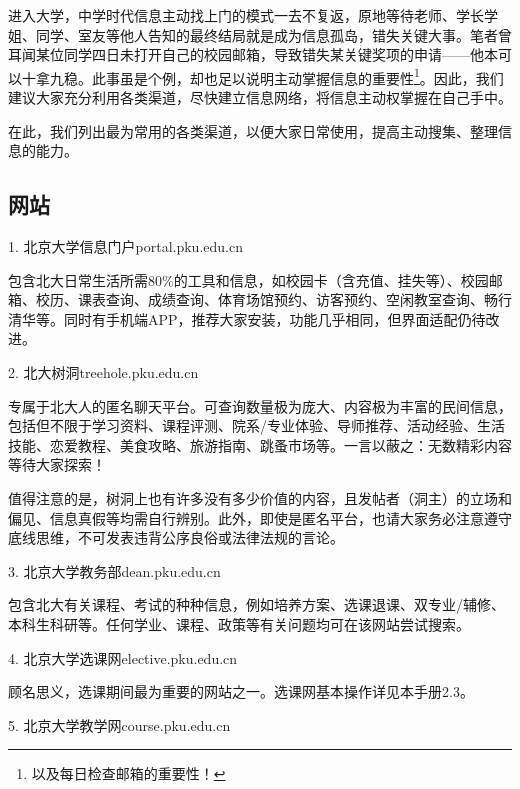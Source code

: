 \documentclass[11pt,oneside]{book}
\begin{document}
进入大学，中学时代信息主动找上门的模式一去不复返，原地等待老师、学长学姐、同学、室友等他人告知的最终结局就是成为信息孤岛，错失关键大事。笔者曾耳闻某位同学四日未打开自己的校园邮箱，导致错失某关键奖项的申请——他本可以十拿九稳。此事虽是个例，却也足以说明主动掌握信息的重要性\footnote{以及每日检查邮箱的重要性！}。因此，我们建议大家充分利用各类渠道，尽快建立信息网络，将信息主动权掌握在自己手中。

在此，我们列出最为常用的各类渠道，以便大家日常使用，提高主动搜集、整理信息的能力。

\subsection{网站}

1. 北京大学信息门户\quad portal.pku.edu.cn

包含北大日常生活所需80\%的工具和信息，如校园卡（含充值、挂失等）、校园邮箱、校历、课表查询、成绩查询、体育场馆预约、访客预约、空闲教室查询、畅行清华等。同时有手机端APP，推荐大家安装，功能几乎相同，但界面适配仍待改进。

\vspace{10pt}

2. 北大树洞\quad treehole.pku.edu.cn

专属于北大人的匿名聊天平台。可查询数量极为庞大、内容极为丰富的民间信息，包括但不限于学习资料、课程评测、院系/专业体验、导师推荐、活动经验、生活技能、恋爱教程、美食攻略、旅游指南、跳蚤市场等。一言以蔽之：无数精彩内容等待大家探索！

值得注意的是，树洞上也有许多没有多少价值的内容，且发帖者（洞主）的立场和偏见、信息真假等均需自行辨别。此外，即使是匿名平台，也请大家务必注意遵守底线思维，不可发表违背公序良俗或法律法规的言论。

\vspace{10pt}

3. 北京大学教务部\quad dean.pku.edu.cn

包含北大有关课程、考试的种种信息，例如培养方案、选课退课、双专业/辅修、本科生科研等。任何学业、课程、政策等有关问题均可在该网站尝试搜索。

\vspace{10pt}

4. 北京大学选课网\quad elective.pku.edu.cn

顾名思义，选课期间最为重要的网站之一。选课网基本操作详见本手册2.3。

\vspace{10pt}

5. 北京大学教学网\quad course.pku.edu.cn
\end{document}
